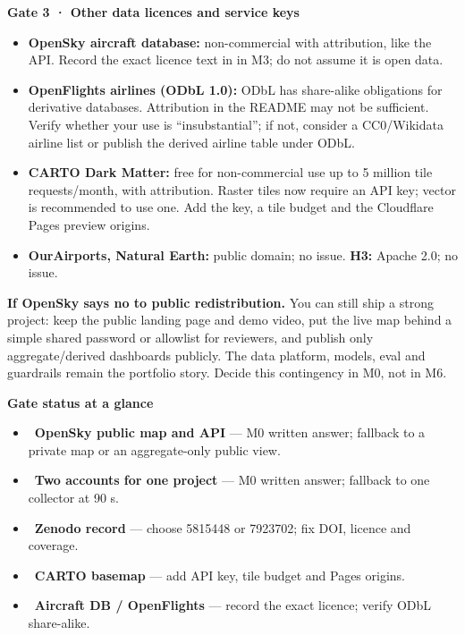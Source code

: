 \documentclass[10.5pt]{article}
\begin{document}
\vspace{6pt}
\begin{warncard}
{\large\bfseries Gate 3 · Other data licences and service keys}

\vspace{2pt}
\begin{itemize}[leftmargin=1.1em,itemsep=2pt,topsep=2pt]
  \item \textbf{OpenSky aircraft database:} non-commercial with attribution, like the API. Record the exact licence text in  in M3; do not assume it is open data.
  \item \textbf{OpenFlights airlines (ODbL 1.0):} ODbL has share-alike obligations for derivative databases. Attribution in the README may not be sufficient. Verify whether your use is ``insubstantial''; if not, consider a CC0/Wikidata airline list or publish the derived airline table under ODbL.
  \item \textbf{CARTO Dark Matter:} free for non-commercial use up to 5 million tile requests/month, with attribution. Raster tiles now require an API key; vector is recommended to use one. Add the key, a tile budget and the Cloudflare Pages preview origins.
  \item \textbf{OurAirports, Natural Earth:} public domain; no issue. \textbf{H3:} Apache 2.0; no issue.
\end{itemize}
\end{warncard}

\vspace{4pt}
\begin{accentcard}
{\bfseries If OpenSky says no to public redistribution.} You can still ship a strong project: keep the public landing page and demo video, put the live map behind a simple shared password or allowlist for reviewers, and publish only aggregate/derived dashboards publicly. The data platform, models, eval and guardrails remain the portfolio story. Decide this contingency in M0, not in M6.
\end{accentcard}

\vspace{4pt}
\begin{softcard}
{\bfseries Gate status at a glance}
\vspace{2pt}
\begin{itemize}[leftmargin=1.2em,itemsep=2pt,topsep=2pt]
  \item \dotbad\ \textbf{OpenSky public map and API} --- M0 written answer; fallback to a private map or an aggregate-only public view.
  \item \dotwarn\ \textbf{Two accounts for one project} --- M0 written answer; fallback to one collector at 90 s.
  \item \dotbad\ \textbf{Zenodo record} --- choose 5815448 or 7923702; fix DOI, licence and coverage.
  \item \dotwarn\ \textbf{CARTO basemap} --- add API key, tile budget and Pages origins.
  \item \dotwarn\ \textbf{Aircraft DB / OpenFlights} --- record the exact licence; verify ODbL share-alike.
\end{itemize}
\end{softcard}
\end{document}
